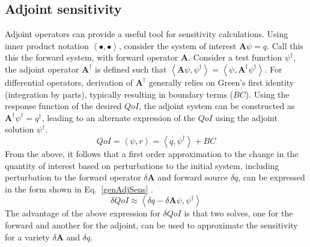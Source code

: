 \documentclass{article}
\newcommand{\bra}{\left\langle}
\newcommand{\ket}{\right\rangle}
\newcommand{\qoi}{QoI}
\begin{document}
\subsection{Adjoint sensitivity}

Adjoint operators can provide a useful tool for sensitivity calculations. Using inner product notation $\bra \bullet , \bullet \ket$, consider the system of interest $\mathbf{A} \psi = q$. Call this this the forward system, with forward operator $\mathbf{A}$. Consider a test function $\psi^\dag$, the adjoint operator $\mathbf{A^\dag}$ is defined such that $\bra \mathbf{A} \psi, \psi^\dag \ket = \bra \psi, \mathbf{A^\dag} \psi^\dag \ket $. For differential operators, derivation of $\mathbf{A^\dag}$ generally relies on Green's first identity (integration by parts), typically resulting in boundary terms ($BC$). Using the response function of the desired $\qoi$, the adjoint system can be constructed as $\mathbf{A^\dag} \psi^\dag = q^\dag$, leading to an alternate expression of the $\qoi$ using the adjoint solution $\psi^\dag $.
\begin{equation}
\label{genAdjQoI}
\qoi = \bra \psi, r \ket = \bra q , \psi^\dag \ket + BC
\end{equation} 
From the above, it follows that a first order approximation to the change in the quantity of interest based on perturbations to the initial system, including perturbation to the forward operator $\delta \mathbf{A}$ and forward source $\delta q$, can be expressed in the form shown in Eq.~\eqref{genAdjSens} \cite{Marchuk}.
\begin{equation}
\label{genAdjSens}
\delta \qoi \approx \bra \delta q - \delta \mathbf{A} \psi , \psi^\dag \ket 
\end{equation}
The advantage of the above expression for $\delta \qoi$ is that two solves, one for the forward and another for the adjoint, can be used to approximate the sensitivity for a variety $\delta \mathbf{A}$ and $\delta q$.

 
\end{document}
